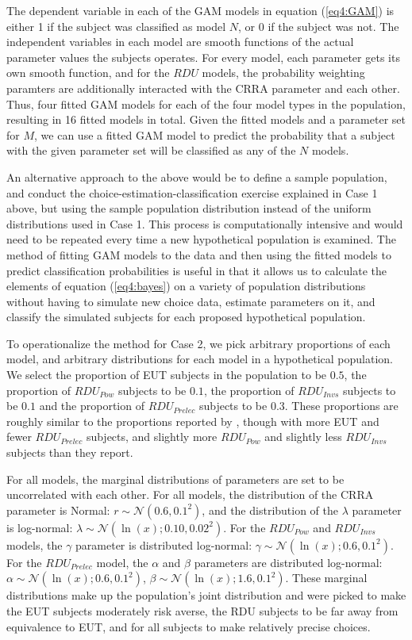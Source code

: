 \documentclass[../main.tex]{subfiles}
\begin{document}
The dependent variable in each of the GAM models in equation (\ref{eq4:GAM}) is either 1 if the subject was classified as model $N$, or 0 if the subject was not.
The independent variables in each model are smooth functions of the actual parameter values the subjects operates.
For every model, each parameter gets its own smooth function, and for the $RDU$ models, the probability weighting paramters are additionally interacted with the CRRA parameter and each other.
Thus, four fitted GAM models for each of the four model types in the population, resulting in 16 fitted models in total.
Given the fitted models and a parameter set for $M$, we can use a fitted GAM model to predict the probability that a subject with the given parameter set will be classified as any of the $N$ models.

An alternative approach to the above would be to define a sample population, and conduct the choice-estimation-classification exercise explained in Case 1 above, but using the sample population distribution instead of the uniform distributions used in Case 1.
This process is computationally intensive and would need to be repeated every time a new hypothetical population is examined.
The method of fitting GAM models to the data and then using the fitted models to predict classification probabilities is useful in that it allows us to calculate the elements of equation (\ref{eq4:bayes}) on a variety of population distributions without having to simulate new choice data, estimate parameters on it, and classify the simulated subjects for each proposed hypothetical population.

To operationalize the method for Case 2, we pick arbitrary proportions of each model, and arbitrary distributions for each model in a hypothetical population.
We select the proportion of EUT subjects in the population to be $0.5$, the proportion of $\mathit{RDU_{Pow}}$ subjects to be $0.1$, the proportion of $\mathit{RDU_{Invs}}$ subjects to be $0.1$ and the proportion of $\mathit{RDU_{Prelec}}$ subjects to be $0.3$.
These proportions are roughly similar to the proportions reported by \textcite[108]{Harrison2016}, though with more EUT and fewer $\mathit{RDU_{Prelec}}$ subjects, and slightly more $\mathit{RDU_{Pow}}$ and slightly less $\mathit{RDU_{Invs}}$ subjects than they report.

For all models, the marginal distributions of parameters are set to be uncorrelated with each other.
For all models, the distribution of the CRRA parameter is Normal: $r \sim \mathcal{N}(0.6, 0.1^2)$, and the distribution of the $\lambda$ parameter is log-normal: $\lambda \sim \mathcal{N}(\ln(x);0.10, 0.02^2)$.
For the $\mathit{RDU_{Pow}}$ and $\mathit{RDU_{Invs}}$ models, the $\gamma$ parameter is distributed log-normal: $\gamma \sim \mathcal{N}(\ln(x);0.6, 0.1^2)$.
For the $\mathit{RDU_{Prelec}}$ model, the $\alpha$ and $\beta$ parameters are distributed log-normal: $\alpha \sim \mathcal{N}(\ln(x);0.6, 0.1^2)$, $\beta \sim \mathcal{N}(\ln(x);1.6, 0.1^2)$.
These marginal distributions make up the population's joint distribution and were picked to make the EUT subjects moderately risk averse, the RDU subjects to be far away from equivalence to EUT, and for all subjects to make relatively precise choices.
\end{document}
